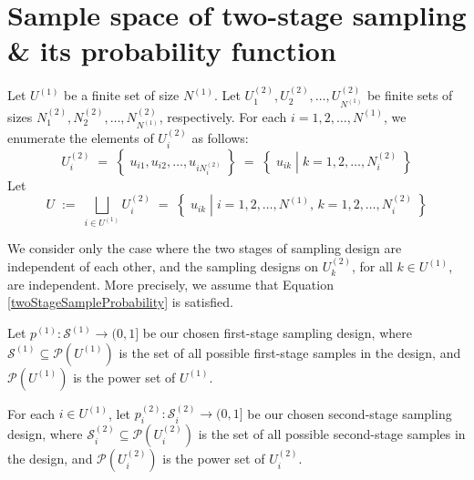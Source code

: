 

\section{Sample space of two-stage sampling \& its probability function}
\setcounter{theorem}{0}

Let $U^{(1)}$ be a finite set of size $N^{(1)}$.
Let $U^{(2)}_{1}, U^{(2)}_{2},\ldots,U^{(2)}_{N^{(1)}}$ be finite sets
of sizes $N^{(2)}_{1}, N^{(2)}_{2},\ldots,N^{(2)}_{N^{(1)}}$, respectively.
For each $i = 1, 2, \ldots, N^{(1)}$, we enumerate the elements of $U^{(2)}_{i}$ as follows:
\begin{equation*}
U^{(2)}_{i}
\;=\; \left\{\;u_{i1},u_{i2},\ldots,u_{iN^{(2)}_{i}}\;\right\}
\;=\; \left\{\;u_{ik}\;\left\vert\; k = 1,2,\ldots,N^{(2)}_{i}\right.\;\right\}
\end{equation*}
Let
\begin{equation*}
U
\;:=\; \bigsqcup_{i \in U^{(1)}}U^{(2)}_{i}
\;=\;  \left\{\;u_{ik}\;\left\vert\; i=1,2,\ldots,N^{(1)},\,k = 1,2,\ldots,N^{(2)}_{i}\right.\;\right\}
\end{equation*}

\vskip 0.3cm
\begin{remark}\quad
We consider only the case where the two stages of sampling design are independent
of each other, and the sampling designs on $U^{(2)}_{k}$, for all $k \in U^{(1)}$, are
independent.
More precisely, we assume that Equation \eqref{twoStageSampleProbability} is satisfied.
\end{remark}

\vskip 0.3cm
\noindent
Let $p^{(1)}:\mathcal{S}^{(1)} \longrightarrow (0,1]$ be our chosen first-stage sampling design,
where $\mathcal{S}^{(1)} \subseteq \mathcal{P}\!\left(U^{(1)}\right)$
is the set of all possible first-stage samples in the design, and
$\mathcal{P}\!\left(U^{(1)}\right)$ is the power set of $U^{(1)}$.

\vskip 0.3cm
\noindent
For each $i \in U^{(1)}$, let $p^{(2)}_{i} : \mathcal{S}^{(2)}_{i} \longrightarrow (0,1]$ be our chosen second-stage sampling design,
where $\mathcal{S}^{(2)}_{i} \subseteq \mathcal{P}\!\left(U^{(2)}_{i}\right)$
is the set of all possible second-stage samples in the design, and
$\mathcal{P}\!\left(U^{(2)}_{i}\right)$ is the power set of $U^{(2)}_{i}$.

